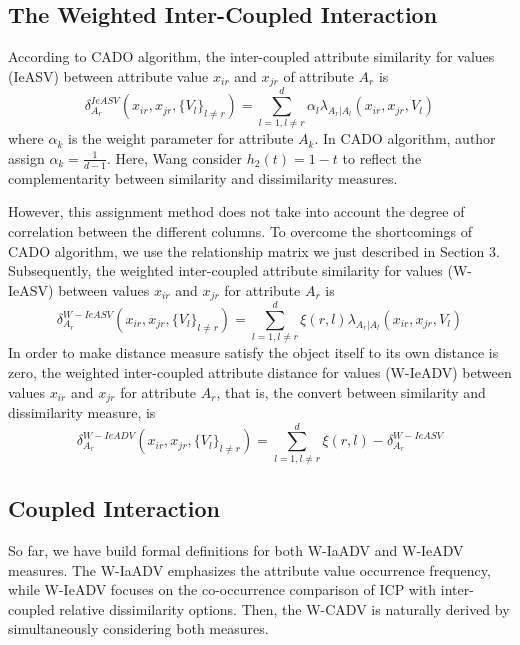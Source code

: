 \documentclass[review]{elsarticle}
\begin{document}
\subsection{The Weighted Inter-Coupled Interaction}
According to CADO algorithm, the inter-coupled attribute similarity for values (IeASV) between attribute value $x_{ir}$ and $x_{jr}$ of attribute $A_r$ is
\begin{equation}
\delta_{A_r}^{IeASV}(x_{ir},x_{jr},\{V_l\}_{l \neq r}) = \sum_{l=1,l \neq r}^{d} \alpha_l \lambda_{A_r|A_l}(x_{ir},x_{jr},V_l)
\label{equ19}
\end{equation}
where $\alpha_k$ is the weight parameter for attribute $A_k$. In CADO algorithm, author assign $\alpha_k = \frac{1}{d-1}$. Here, Wang consider $h_2(t) = 1 - t$ to reflect the complementarity between similarity and dissimilarity measures.

However, this assignment method does not take into account the degree of correlation between the different columns. To overcome the shortcomings of CADO algorithm, we use the relationship matrix we just described in Section 3.
Subsequently, the weighted inter-coupled attribute similarity for values (W-IeASV) between values $x_{ir}$ and $x_{jr}$ for attribute $A_r$ is
\begin{equation}
\delta_{A_r}^{W-IeASV}(x_{ir},x_{jr},\{V_l\}_{l \neq r}) = \sum_{l=1,l \neq r}^{d} \xi(r,l) \lambda_{A_r|A_l}(x_{ir},x_{jr},V_l)
\label{equ20}
\end{equation}
In order to make distance measure satisfy the object itself to its own distance is zero, the weighted inter-coupled attribute distance for values (W-IeADV) between values $x_{ir}$ and $x_{jr}$ for attribute $A_r$, that is, the convert between similarity and dissimilarity measure, is
\begin{equation}
\delta_{A_r}^{W-IeADV}(x_{ir},x_{jr},\{V_l\}_{l \neq r}) = \sum_{l=1,l \neq r}^{d} \xi(r,l) - \delta_{A_r}^{W-IeASV}
\label{equ21}
\end{equation}

\subsection{Coupled Interaction}
So far, we have build formal definitions for both W-IaADV and W-IeADV measures. The W-IaADV emphasizes the attribute value occurrence frequency, while W-IeADV focuses on the co-occurrence comparison of ICP with inter-coupled relative dissimilarity options. Then, the W-CADV is naturally derived by simultaneously considering both measures.
\end{document}
